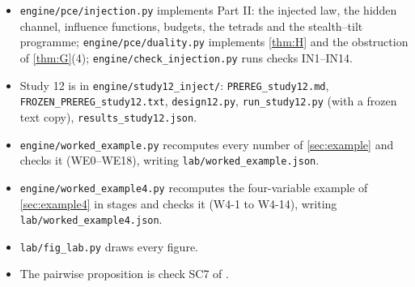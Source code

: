 \documentclass[11pt]{article}
\theoremstyle{definition}\newtheorem{definition}{Definition}\newtheorem{remark}{Remark}
\begin{document}
{\begin{itemize}
  \texttt{run\_study11c.py} (with a frozen text copy), \texttt{results\_study11c.json}; the ring-of-tables checks are
  \texttt{engine/check\_ehrhart.py} (EH1--EH7) with \texttt{engine/pce/ehrhart.py}, and the figure is \texttt{lab/fig\_ehrhart.py}.
\item \texttt{engine/pce/injection.py} implements Part II: the injected law, the hidden channel, influence functions, budgets, the
  tetrads and the stealth--tilt programme; \texttt{engine/pce/duality.py} implements \cref{thm:H} and the obstruction of
  \cref{thm:G}(4); \texttt{engine/check\_injection.py} runs checks IN1--IN14.
\item Study 12 is in \texttt{engine/study12\_inject/}: \texttt{PREREG\_study12.md}, \texttt{FROZEN\_PREREG\_study12.txt},
  \texttt{design12.py}, \texttt{run\_study12.py} (with a frozen text copy), \texttt{results\_study12.json}.
\item \texttt{engine/worked\_example.py} recomputes every number of \cref{sec:example} and checks it (WE0--WE18), writing
  \texttt{lab/worked\_example.json}.
\item \texttt{engine/worked\_example4.py} recomputes the four-variable example of \cref{sec:example4} in stages and checks it
  (W4-1 to W4-14), writing \texttt{lab/worked\_example4.json}.
\item \texttt{lab/fig\_lab.py} draws every figure.
\item The pairwise proposition is check SC7 of \cite{PG}.
\end{itemize}\par}



\end{document}
